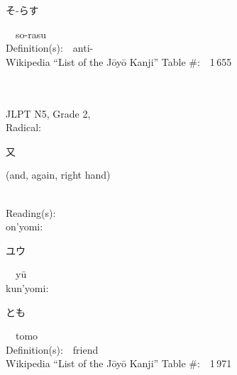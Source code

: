 \begin{multicols}{2}
{\hspace*{2em}}{\begin{CJK}{UTF8}{min} そ-らす \end{CJK}}\ \ so-rasu\ \ \\
Definition(s):\ \ anti- \\
Wikipedia ``List of the J\=oy\=o Kanji'' Table \#:\ \ 1\,655 \\
\ \ \\
{\fontsize{34pt}{40pt}  }\ \ \\  %
{JLPT N5, Grade 2, \\Radical:\ \ {\begin{CJK}{UTF8}{min} 又 \end{CJK}} (and, again, right hand) } \\
Reading(s):\ \ \\
{\hspace*{1em}}on'yomi:\ \ \\
{\hspace*{2em}}{\begin{CJK}{UTF8}{min} ユウ \end{CJK}}\ \ y\=u\ \ \\
{\hspace*{1em}}kun'yomi:\ \ \\
{\hspace*{2em}}{\begin{CJK}{UTF8}{min} とも \end{CJK}}\ \ tomo\ \ \\
Definition(s):\ \ friend \\
Wikipedia ``List of the J\=oy\=o Kanji'' Table \#:\ \ 1\,971 \\
\ \ \\
\end{multicols}



